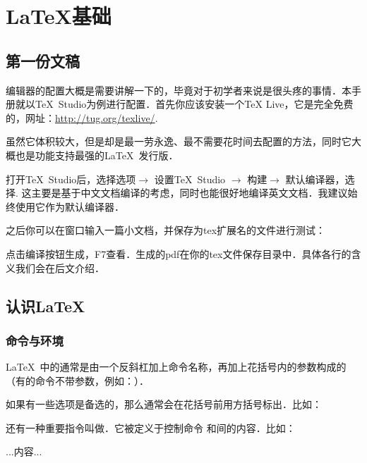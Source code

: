 \chapter{\LaTeX{}基础}
\section{第一份文稿}

编辑器的配置大概是需要讲解一下的，毕竟对于初学者来说是很头疼的事情．本手册就以\TeX\ Studio为例进行配置．首先你应该安装一个\TeX{} Live，它是完全免费的，网址：\url{http://tug.org/texlive/}.

虽然它体积较大，但是却是最一劳永逸、最不需要花时间去配置的方法，同时它大概也是功能支持最强的\LaTeX\ 发行版．

打开\TeX\ Studio后，选择选项$\rightarrow$ 设置\TeX\ Studio $\rightarrow$ 构建$\rightarrow$ 默认编译器，选择\xelatex{}. 这主要是基于中文文档编译的考虑，同时\xelatex 也能很好地编译英文文档．我建议始终使用它作为默认编译器．\dpar

之后你可以在窗口输入一篇小文档，并保存为tex扩展名的文件进行测试：

点击编译按钮生成，F7查看．生成的pdf在你的tex文件保存目录中．具体各行的含义我们会在后文介绍．

\section{认识\LaTeX}
\subsection{命令与环境}
\LaTeX\ 中的通常是由一个反斜杠加上命令名称，再加上花括号内的参数构成的（有的命令不带参数，例如：）．

如果有一些选项是备选的，那么通常会在花括号前用方括号标出．比如：

还有一种重要指令叫做．它被定义于控制命令 和间的内容．比如：
\begin{latex}

...内容...

\end{latex}

